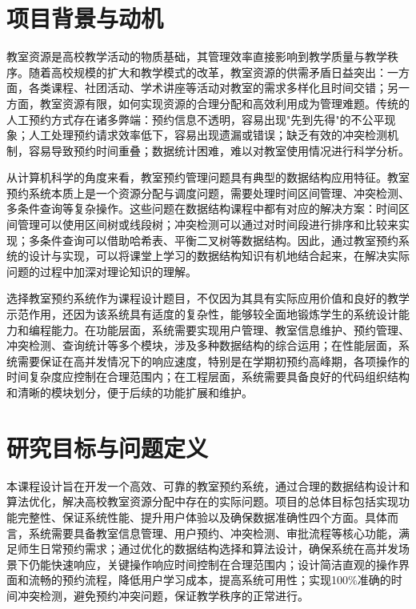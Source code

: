 \documentclass[a4paper,12pt,twoside]{ctexrep}
\begin{document}
\section*{项目背景与动机}

教室资源是高校教学活动的物质基础，其管理效率直接影响到教学质量与教学秩序。随着高校规模的扩大和教学模式的改革，教室资源的供需矛盾日益突出：一方面，各类课程、社团活动、学术讲座等活动对教室的需求多样化且时间交错；另一方面，教室资源有限，如何实现资源的合理分配和高效利用成为管理难题。传统的人工预约方式存在诸多弊端：预约信息不透明，容易出现"先到先得"的不公平现象；人工处理预约请求效率低下，容易出现遗漏或错误；缺乏有效的冲突检测机制，容易导致预约时间重叠；数据统计困难，难以对教室使用情况进行科学分析。

从计算机科学的角度来看，教室预约管理问题具有典型的数据结构应用特征。教室预约系统本质上是一个资源分配与调度问题，需要处理时间区间管理、冲突检测、多条件查询等复杂操作。这些问题在数据结构课程中都有对应的解决方案：时间区间管理可以使用区间树或线段树；冲突检测可以通过对时间段进行排序和比较来实现；多条件查询可以借助哈希表、平衡二叉树等数据结构。因此，通过教室预约系统的设计与实现，可以将课堂上学习的数据结构知识有机地结合起来，在解决实际问题的过程中加深对理论知识的理解。

选择教室预约系统作为课程设计题目，不仅因为其具有实际应用价值和良好的教学示范作用，还因为该系统具有适度的复杂性，能够较全面地锻炼学生的系统设计能力和编程能力。在功能层面，系统需要实现用户管理、教室信息维护、预约管理、冲突检测、查询统计等多个模块，涉及多种数据结构的综合运用；在性能层面，系统需要保证在高并发情况下的响应速度，特别是在学期初预约高峰期，各项操作的时间复杂度应控制在合理范围内；在工程层面，系统需要具备良好的代码组织结构和清晰的模块划分，便于后续的功能扩展和维护。

\section*{研究目标与问题定义}

本课程设计旨在开发一个高效、可靠的教室预约系统，通过合理的数据结构设计和算法优化，解决高校教室资源分配中存在的实际问题。项目的总体目标包括实现功能完整性、保证系统性能、提升用户体验以及确保数据准确性四个方面。具体而言，系统需要具备教室信息管理、用户预约、冲突检测、审批流程等核心功能，满足师生日常预约需求；通过优化的数据结构选择和算法设计，确保系统在高并发场景下仍能快速响应，关键操作响应时间控制在合理范围内；设计简洁直观的操作界面和流畅的预约流程，降低用户学习成本，提高系统可用性；实现100\%准确的时间冲突检测，避免预约冲突问题，保证教学秩序的正常进行。
\end{document}

